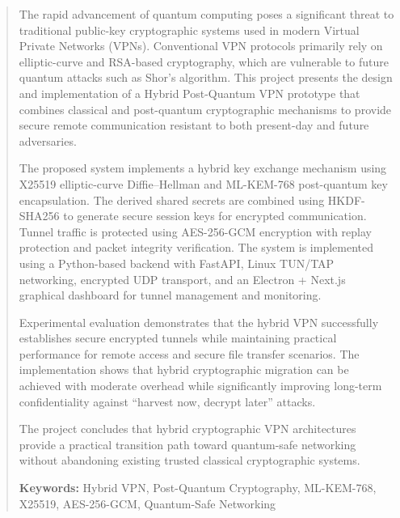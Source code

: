 \begin{abstract}

The rapid advancement of quantum computing poses a significant threat to traditional public-key cryptographic systems used in modern Virtual Private Networks (VPNs). Conventional VPN protocols primarily rely on elliptic-curve and RSA-based cryptography, which are vulnerable to future quantum attacks such as Shor’s algorithm. This project presents the design and implementation of a Hybrid Post-Quantum VPN prototype that combines classical and post-quantum cryptographic mechanisms to provide secure remote communication resistant to both present-day and future adversaries.

The proposed system implements a hybrid key exchange mechanism using X25519 elliptic-curve Diffie–Hellman and ML-KEM-768 post-quantum key encapsulation. The derived shared secrets are combined using HKDF-SHA256 to generate secure session keys for encrypted communication. Tunnel traffic is protected using AES-256-GCM encryption with replay protection and packet integrity verification. The system is implemented using a Python-based backend with FastAPI, Linux TUN/TAP networking, encrypted UDP transport, and an Electron + Next.js graphical dashboard for tunnel management and monitoring.

Experimental evaluation demonstrates that the hybrid VPN successfully establishes secure encrypted tunnels while maintaining practical performance for remote access and secure file transfer scenarios. The implementation shows that hybrid cryptographic migration can be achieved with moderate overhead while significantly improving long-term confidentiality against “harvest now, decrypt later” attacks.

The project concludes that hybrid cryptographic VPN architectures provide a practical transition path toward quantum-safe networking without abandoning existing trusted classical cryptographic systems.

\textbf{Keywords:} Hybrid VPN, Post-Quantum Cryptography, ML-KEM-768, X25519, AES-256-GCM, Quantum-Safe Networking

\end{abstract}